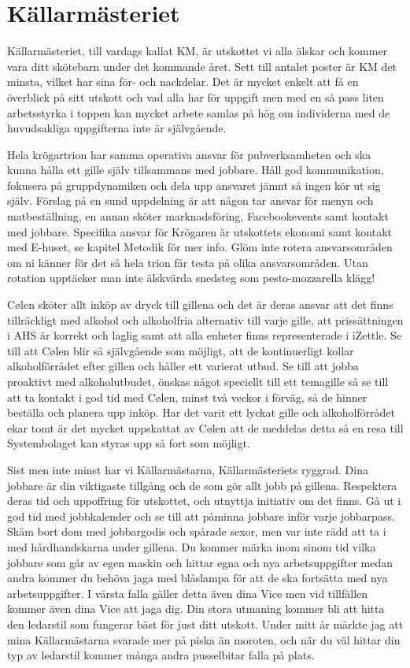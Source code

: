 \documentclass[10pt]{article}
\begin{document}
\section{Källarmästeriet}
Källarmästeriet, till vardags kallat KM, är utskottet vi alla älskar och kommer vara ditt skötebarn under det kommande året. Sett till antalet poster är KM det minsta, vilket har sina för- och nackdelar. Det är mycket enkelt att få en överblick på sitt utskott och vad alla har för uppgift men med en så pass liten arbetsstyrka i toppen kan mycket arbete samlas på hög om individerna med de huvudsakliga uppgifterna inte är självgående.

Hela krögartrion har samma operativa ansvar för pubverksamheten och ska kunna hålla ett gille själv tillsammans med jobbare. Håll god kommunikation, fokusera på gruppdynamiken och dela upp ansvaret jämnt så ingen kör ut sig själv. Förslag på en sund uppdelning är att någon tar ansvar för menyn och matbeställning, en annan sköter marknadsföring, Facebookevents samt kontakt med jobbare. Specifika ansvar för Krögaren är utskottets ekonomi samt kontakt med E-huset, se kapitel Metodik för mer info. Glöm inte rotera ansvarsområden om ni känner för det så hela trion får testa på olika ansvarsområden. Utan rotation upptäcker man inte älskvärda snedsteg som pesto-mozzarella klägg!

Cølen sköter allt inköp av dryck till gillena och det är deras ansvar att det finns tillräckligt med alkohol och alkoholfria alternativ till varje gille, att prissättningen i AHS är korrekt och laglig samt att alla enheter finns representerade i iZettle. Se till att Cølen blir så självgående som möjligt, att de kontinuerligt kollar alkoholförrådet efter gillen och håller ett varierat utbud. Se till att jobba proaktivt med alkoholutbudet, önskas något speciellt till ett temagille så se till att ta kontakt i god tid med Cølen, minst två veckor i förväg, så de hinner beställa och planera upp inköp. Har det varit ett lyckat gille och alkoholförrådet ekar tomt är det mycket uppskattat av Cølen att de meddelas detta så en resa till Systembolaget kan styras upp så fort som möjligt.

Sist men inte minst har vi Källarmästarna, Källarmästeriets ryggrad. Dina jobbare är din viktigaste tillgång och de som gör allt jobb på gillena. Respektera deras tid och uppoffring för utskottet, och utnyttja initiativ om det finns. Gå ut i god tid med jobbkalender och se till att påminna jobbare inför varje jobbarpass. Skäm bort dom med jobbargodis och spårade sexor, men var inte rädd att ta i med hårdhandskarna under gillena. Du kommer märka inom sinom tid vilka jobbare som går av egen maskin och hittar egna och nya arbetsuppgifter medan andra kommer du behöva jaga med blåslampa för att de ska fortsätta med nya arbetsuppgifter. I värsta falla gäller detta även dina Vice men vid tillfällen kommer även dina Vice att jaga dig. Din stora utmaning kommer bli att hitta den ledarstil som fungerar bäst för just ditt utskott. Under mitt år märkte jag att mina Källarmästarna svarade mer på piska än moroten, och när du väl hittar din typ av ledarstil kommer många andra pusselbitar falla på plats.
\end{document}
